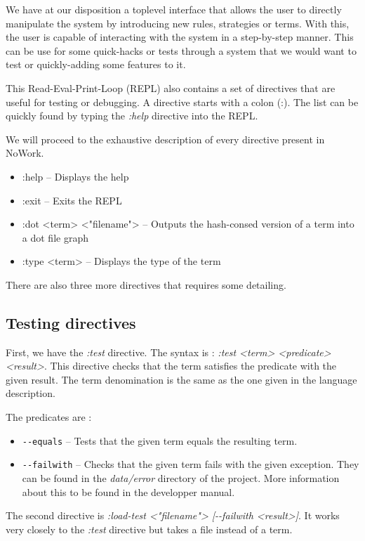 \documentclass[12pt,a4paper]{article}
\begin{document}
We have at our disposition a toplevel interface that allows the user
to directly manipulate the system by introducing new rules, strategies
or terms. With this, the user is capable of interacting with the
system in a step-by-step manner. This can be use for some quick-hacks
or tests through a system that we would want to test or quickly-adding
some features to it.

This Read-Eval-Print-Loop (REPL) also contains a set of directives
that are useful for testing or debugging. A directive starts with a
colon (:). The list can be quickly found by typing the \emph{:help}
directive into the REPL.

We will proceed to the exhaustive description of every directive
present in NoWork.

\begin{itemize}
  \item :help -- Displays the help
  \item :exit -- Exits the REPL
  \item :dot <term> <"filename"> -- Outputs the hash-consed version of
    a term into a dot file graph
  \item :type <term> -- Displays the type of the term
\end{itemize}

There are also three more directives that requires some detailing.

\subsection{Testing directives}

First, we have the \emph{:test} directive. The syntax is : \emph{:test
  <term> <predicate> <result>}. This directive checks that the term
satisfies the predicate with the given result. The term denomination
is the same as the one given in the language description.

The predicates are : 
\begin{itemize}
\item \texttt{-{}-equals} -- Tests that the given term equals the resulting term.
\item \texttt{-{}-failwith} -- Checks that the given term fails with the
  given exception. They can be found in the \emph{data/error}
  directory of the project. More information about this to be found in
  the developper manual.
\end{itemize}

The second directive is \emph{:load-test <"filename"> [-{}-failwith
  <result>]}. It works very closely to the \emph{:test} directive but
takes a file instead of a term.
\end{document}
